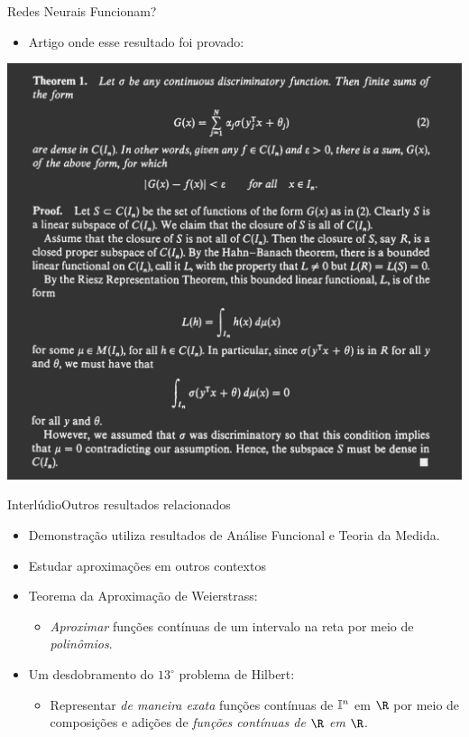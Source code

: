 \documentclass[13pt]{beamer}
\begin{document}
\begin{frame}{Redes Neurais Funcionam?}
    \begin{itemize}
        \item<1-> Artigo onde esse resultado foi provado: \cite{cybenko89}
    \end{itemize}
    \begin{center}
        \includegraphics[width=.7\textwidth]{../figuras/cybenko.png}
    \end{center}
\end{frame}


\begin{frame}{Interlúdio}{Outros resultados relacionados}
    \begin{itemize}
        \item<1-> Demonstração utiliza resultados de Análise Funcional e Teoria da Medida.
        \item<2-> Estudar aproximações em outros contextos
        \item<3-> Teorema da Aproximação de Weierstrass:
            \begin{itemize}
                \item<4-> \emph{Aproximar} funções contínuas de um intervalo na reta por meio de \emph{polinômios}.
            \end{itemize}
        \item<5-> Um desdobramento do \( 13^{ \circ } \) problema de Hilbert:
            \begin{itemize}
                \item<6-> Representar \emph{de maneira exata} funções contínuas de \( \mathbb{I}^{ n } \) em \( \R \) por meio de composições e adições de \emph{funções contínuas de \( \R \) em \( \R \)}.
            \end{itemize}
    \end{itemize}
\end{frame}
\end{document}
